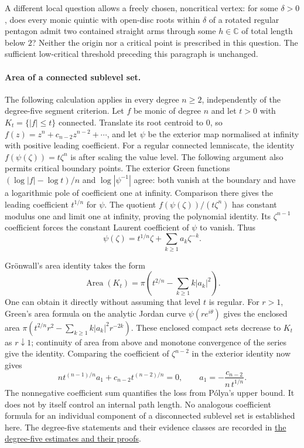 A different local question allows a freely chosen, noncritical vertex:
for some $\delta>0$, does every monic quintic with open-disc roots within
$\delta$ of a rotated regular pentagon admit two contained straight arms
through some $h\in\mathbb C$ of total length below $2$?
Neither the origin nor a critical point is prescribed in this question.
The sufficient low-critical threshold preceding this paragraph is unchanged.

\paragraph{Area of a connected sublevel set.}
The following calculation applies in every degree $n\ge2$, independently
of the degree-five segment criterion. Let $f$ be monic of degree $n$ and let $t>0$ with
$K_t=\{|f|\le t\}$ connected. Translate its root centroid to $0$, so
$f(z)=z^n+c_{n-2}z^{n-2}+\cdots$, and let $\psi$ be the exterior map
normalised at infinity with positive leading coefficient. For a regular
connected lemniscate, the identity $f(\psi(\zeta))=t\zeta^n$ is
\cite[(2.3)]{eks2010} after scaling the value level. The following argument
also permits critical boundary points. The exterior Green functions
$(\log|f|-\log t)/n$ and $\log|\psi^{-1}|$ agree: both vanish at the
boundary and have a logarithmic pole of coefficient one at infinity.
Comparison there gives the leading coefficient $t^{1/n}$ for $\psi$.
The quotient $f(\psi(\zeta))/(t\zeta^n)$ has constant modulus one and
limit one at infinity, proving the polynomial identity. Its
$\zeta^{n-1}$ coefficient forces the constant Laurent coefficient of
$\psi$ to vanish. Thus
\[
 \psi(\zeta)=t^{1/n}\zeta+\sum_{k\ge1}a_k\zeta^{-k}.
\]

Gr\"onwall's area identity takes the form
\[
 \operatorname{Area}(K_t)=\pi\left(t^{2/n}-
 \sum_{k\ge1}k|a_k|^2\right).
\]
One can obtain it directly without assuming that level $t$ is regular.
For $r>1$, Green's area formula on the analytic Jordan curve
$\psi(re^{i\theta})$ gives the enclosed area
$\pi(t^{2/n}r^2-\sum_{k\ge1}k|a_k|^2r^{-2k})$.
These enclosed compact sets decrease to $K_t$ as $r\downarrow1$;
continuity of area from above and monotone convergence of the series
give the identity. Comparing the coefficient of $\zeta^{n-2}$ in the
exterior identity now gives
\[
 nt^{(n-1)/n}a_1+c_{n-2}t^{(n-2)/n}=0,
 \qquad a_1=-\frac{c_{n-2}}{n\,t^{1/n}}.
\]
The nonnegative coefficient sum quantifies the loss from P\'olya's
upper bound. It does not by itself control an internal path length.
No analogous coefficient formula for an individual component of a
disconnected sublevel set is established here. The
degree-five statements and their evidence classes are recorded in
\href{https://github.com/wcook04/plectis-erdos/blob/f214a6b45528dc5eefe20ffadc35f2e981627d4c/research_corpus/Erdos1041/Degree5AssemblyAndSharpenedCuts.md}{the degree-five estimates and their proofs}.

